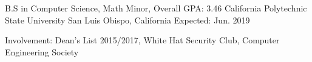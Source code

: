 


\begin{cventries}


\cventry
{B.S in Computer Science, Math Minor, Overall GPA: 3.46} %
{California Polytechnic State University} %
{San Luis Obispo, California} %
{Expected: Jun. 2019} %
{ %
\begin{cvitems}
\item {Involvement: Dean's List 2015/2017, White Hat Security Club, Computer Engineering Society }
\end{cvitems}
}


\end{cventries}
